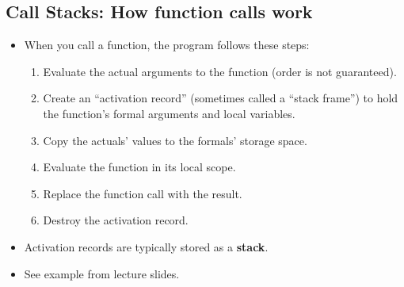 \subsection{Call Stacks: How function calls work}
\begin{itemize}
	\item When you call a function, the program follows these steps:
	\begin{enumerate}
		\item Evaluate the actual arguments to the function (order is not guaranteed).
		\item Create an ``activation record'' (sometimes called a ``stack frame'') to hold the function's formal arguments and local variables.
		\item Copy the actuals' values to the formals' storage space.
		\item Evaluate the function in its local scope.
		\item Replace the function call with the result.
		\item Destroy the activation record.
	\end{enumerate}

	\item Activation records are typically stored as a \textbf{stack}.
	\item See example from lecture slides.
\end{itemize}

